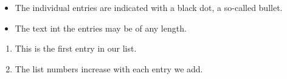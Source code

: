 \documentclass{article}
\begin{document}
\begin{itemize}
    \item The individual entries are indicated with a black dot, a so-called bullet.
    \item The text int the entries may be of any length.
\end{itemize}

\begin{enumerate}
    \item This is the first entry in our list.
    \item The list numbers increase with each entry we add.
\end{enumerate}
\end{document}
